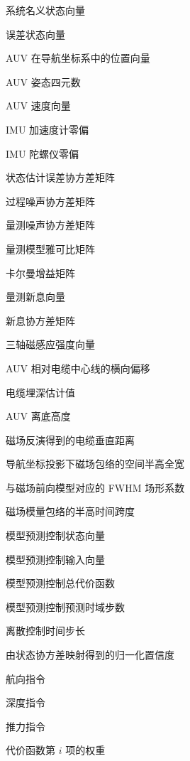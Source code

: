 \begin{denotation}[2.5cm]
  \item[$\boldsymbol{x}$] 系统名义状态向量
  \item[$\delta\boldsymbol{x}$] 误差状态向量
  \item[$\boldsymbol{p}$] AUV 在导航坐标系中的位置向量
  \item[$\boldsymbol{q}$] AUV 姿态四元数
  \item[$\boldsymbol{v}$] AUV 速度向量
  \item[$\boldsymbol{b}_a$] IMU 加速度计零偏
  \item[$\boldsymbol{b}_g$] IMU 陀螺仪零偏
  \item[$\boldsymbol{P}$] 状态估计误差协方差矩阵
  \item[$\boldsymbol{Q}$] 过程噪声协方差矩阵
  \item[$\boldsymbol{R}$] 量测噪声协方差矩阵
  \item[$\boldsymbol{H}$] 量测模型雅可比矩阵
  \item[$\boldsymbol{K}$] 卡尔曼增益矩阵
  \item[$\boldsymbol{y}$] 量测新息向量
  \item[$\boldsymbol{S}$] 新息协方差矩阵
  \item[$\boldsymbol{B}$] 三轴磁感应强度向量
  \item[$d_{\mathrm{lat}}$] AUV 相对电缆中心线的横向偏移
  \item[$d_{\mathrm{depth}}$] 电缆埋深估计值
  \item[$h_{\mathrm{alt}}$] AUV 离底高度
  \item[$z_{\mathrm{mag}}$] 磁场反演得到的电缆垂直距离
  \item[$W_x$] 导航坐标投影下磁场包络的空间半高全宽
  \item[$\kappa_M$] 与磁场前向模型对应的 FWHM 场形系数
  \item[$\Delta t_{\mathrm{FWHM}}$] 磁场模量包络的半高时间跨度

  \item[$\boldsymbol{X}$] 模型预测控制状态向量
  \item[$\boldsymbol{U}$] 模型预测控制输入向量
  \item[$J$] 模型预测控制总代价函数
  \item[$N$] 模型预测控制预测时域步数
  \item[$\Delta t$] 离散控制时间步长
  \item[$c$] 由状态协方差映射得到的归一化置信度
  \item[$\psi_{\mathrm{cmd}}$] 航向指令
  \item[$z_{\mathrm{cmd}}$] 深度指令
  \item[$T_{\mathrm{cmd}}$] 推力指令
  \item[$w_i$] 代价函数第 $i$ 项的权重
\end{denotation}

